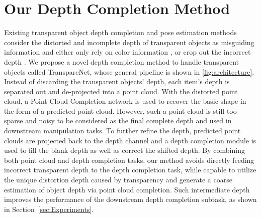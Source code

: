 \documentclass{article}
\newcommand{\algoName}{TranspareNet\xspace}
\begin{document}
\section{Our Depth Completion Method}
Existing transparent object depth completion and pose estimation methods consider the distorted and incomplete depth of transparent objects as misguiding information and either only rely on color information \citep{Keypose}, or crop out the incorrect depth \citep{ClearGrasp}.  We propose a novel depth completion method to handle transparent objects called \algoName, whose general pipeline is shown in \autoref{fig:architecture}. Instead of discarding the transparent objects' depth, each item's depth is separated out and de-projected into a point cloud. With the distorted point cloud, a Point Cloud Completion network is used to recover the basic shape in the form of a predicted point cloud. However, such a point cloud is still too sparse and noisy to be considered as the final complete depth and used in downstream manipulation tasks. To further refine the depth, predicted point clouds are projected back to the depth channel and a depth completion module is used to fill the blank depth as well as correct the shifted depth. By combining both point cloud and depth completion tasks, our method avoids directly feeding incorrect transparent depth to the depth completion task, while capable to utilize the unique distortion depth caused by transparency and generate a coarse estimation of object depth via point cloud completion. Such intermediate depth improves the performance of the downstream depth completion subtask, as shown in Section~\ref{sec:Experiments}.
\end{document}
